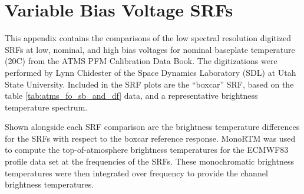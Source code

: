 \section{Variable Bias Voltage SRFs}
\label{app:Vset}
This appendix contains the comparisons of the low spectral resolution digitized SRFs at low, nominal, and high bias voltages for nominal baseplate temperature (20\textdegree{}C) from the ATMS PFM Calibration Data Book\cite{ATMS_PFM_CalLog}. The digitizations were performed by Lynn Chidester of the Space Dynamics Laboratory (SDL) at Utah State University. Included in the SRF plots are the ``boxcar'' SRF, based on the table \ref{tab:atms_fo_sb_and_df} data, and a representative brightness temperature spectrum.

Shown alongside each SRF comparison are the brightness temperature differences for the SRFs with respect to the boxcar reference response. MonoRTM \cite{Clough_2005} was used to compute the top-of-atmosphere brightness temperatures for the ECMWF83 profile data set \cite{ECMWF_profile_set2,Matricardi_ECMWF564} at the frequencies of the SRFs. These monochromatic brightness temperatures were then integrated over frequency to provide the channel brightness temperatures.

\newpage

